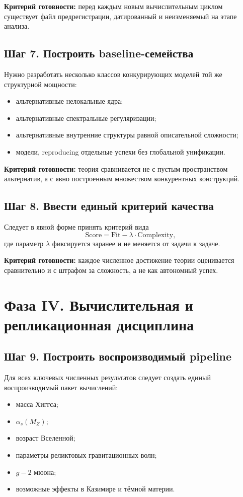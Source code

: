 \documentclass[12pt,a4paper]{article}
\begin{document}
\textbf{Критерий готовности:} перед каждым новым вычислительным циклом существует файл предрегистрации, датированный и неизменяемый на этапе анализа.

\subsection{Шаг 7. Построить baseline-семейства}

Нужно разработать несколько классов конкурирующих моделей той же структурной мощности:
\begin{itemize}
    \item альтернативные нелокальные ядра;
    \item альтернативные спектральные регуляризации;
    \item альтернативные внутренние структуры равной описательной сложности;
    \item модели, reproducing отдельные успехи без глобальной унификации.
\end{itemize}

\textbf{Критерий готовности:} теория сравнивается не с пустым пространством альтернатив, а с явно построенным множеством конкурентных конструкций.

\subsection{Шаг 8. Ввести единый критерий качества}

Следует в явной форме принять критерий вида
\[
\mathrm{Score} = \mathrm{Fit} - \lambda \cdot \mathrm{Complexity},
\]
где параметр \(\lambda\) фиксируется заранее и не меняется от задачи к задаче.

\textbf{Критерий готовности:} каждое численное достижение теории оценивается сравнительно и с штрафом за сложность, а не как автономный успех.

\section{Фаза IV. Вычислительная и репликационная дисциплина}

\subsection{Шаг 9. Построить воспроизводимый pipeline}

Для всех ключевых численных результатов следует создать единый воспроизводимый пакет вычислений:
\begin{itemize}
    \item масса Хиггса;
    \item \(\alpha_s(M_Z)\);
    \item возраст Вселенной;
    \item параметры реликтовых гравитационных волн;
    \item \(g-2\) мюона;
    \item возможные эффекты в Казимире и тёмной материи.
\end{itemize}
\end{document}

